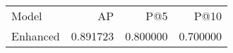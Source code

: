 \begin{tabular}{lrrr}
Model & AP & P@5 & P@10 \\
Enhanced & 0.891723 & 0.800000 & 0.700000 \\
\end{tabular}
